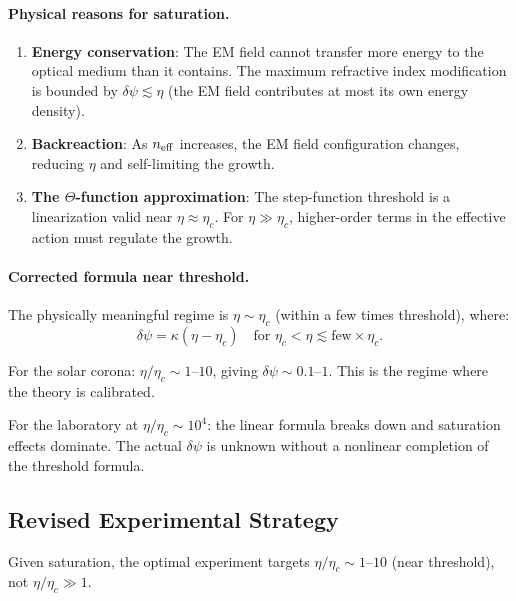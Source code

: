 \documentclass[12pt,a4paper]{article}
\theoremstyle{remark}
\begin{document}
\paragraph{Physical reasons for saturation.}
\begin{enumerate}
\item \textbf{Energy conservation}: The EM field cannot transfer more
  energy to the optical medium than it contains. The maximum refractive
  index modification is bounded by $\delta\psi \lesssim \eta$ (the EM
  field contributes at most its own energy density).

\item \textbf{Backreaction}: As $n_{\rm eff}$ increases, the EM field
  configuration changes, reducing $\eta$ and self-limiting the growth.

\item \textbf{The $\Theta$-function approximation}: The step-function
  threshold is a linearization valid near $\eta \approx \eta_c$. For
  $\eta \gg \eta_c$, higher-order terms in the effective action must
  regulate the growth.
\end{enumerate}

\paragraph{Corrected formula near threshold.}
The physically meaningful regime is $\eta \sim \eta_c$ (within a few times
threshold), where:
\begin{equation}
\delta\psi = \kappa(\eta - \eta_c) \quad \text{for } \eta_c < \eta \lesssim \text{few} \times \eta_c.
\end{equation}

For the solar corona: $\eta/\eta_c \sim 1$--$10$, giving $\delta\psi \sim
0.1$--$1$. This is the regime where the theory is calibrated.

For the laboratory at $\eta/\eta_c \sim 10^4$: the linear formula breaks
down and saturation effects dominate. The actual $\delta\psi$ is unknown
without a nonlinear completion of the threshold formula.

\subsection{Revised Experimental Strategy}

Given saturation, the optimal experiment targets $\eta/\eta_c \sim 1$--$10$
(near threshold), not $\eta/\eta_c \gg 1$.
\end{document}
